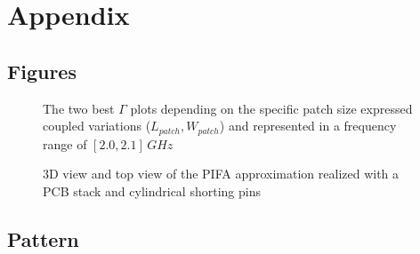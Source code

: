 \documentclass[10pt,a4paper,twocolumn]{article}
\begin{document}
{\twocolumn[{
	\begin{@twocolumnfalse} 
		\printbibliography

	\listoffigures
\end{@twocolumnfalse}
}
]
\clearpage

	\section*{Appendix}


	\subsection*{Figures}


	\begin{figure}[b!]
		\begin{subfigure}{0.48\linewidth}
			\def\svgwidth{\linewidth}
			\tiny{}
						\caption{}
		\end{subfigure}
	\hfill
		\begin{subfigure}{0.48\linewidth}
			\def\svgwidth{\linewidth}
			\tiny{}
			\caption{}
		\end{subfigure}
		\caption{The two best $\Gamma$ plots depending on the specific patch size expressed coupled variations ($L_{patch},W_{patch}$) and represented in a frequency range of $[2.0,2.1]\,GHz$}
		\label{fig:Gamma couple LpWp}
	\end{figure}
	\begin{figure}[b!]
		\begin{subfigure}{0.45\linewidth}
			\def\svgwidth{\linewidth}
			\tiny{}
		\end{subfigure}
	\hfill
		\begin{subfigure}{0.45\linewidth}
			\def\svgwidth{\linewidth}
			\tiny{}
		\end{subfigure}
		\caption{3D view and top view of the PIFA approximation realized with a PCB stack and cylindrical shorting pins}
		\label{fig:pcb shorting}
	\end{figure}


\clearpage


\subsection*{Pattern}


}
\end{document}

